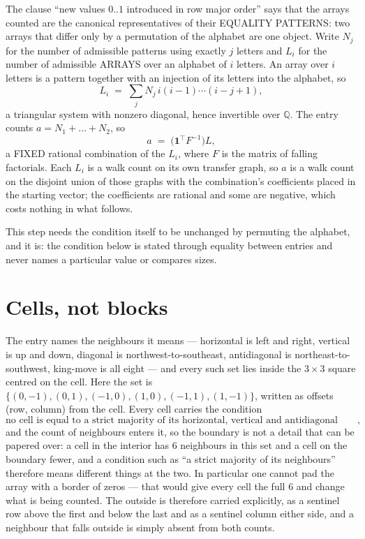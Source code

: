 \documentclass[11pt,a4paper]{article}
\theoremstyle{plain}
\theoremstyle{definition}
\begin{document}
The clause ``new values $0..1$ introduced in row major order'' says that the arrays
counted are the canonical representatives of their EQUALITY PATTERNS: two arrays that differ
only by a permutation of the alphabet are one object. Write $N_j$ for the number of admissible
patterns using exactly $j$ letters and $L_i$ for the number of admissible ARRAYS over an
alphabet of $i$ letters. An array over $i$ letters is a pattern together with an injection of
its letters into the alphabet, so
\[
L_i\;=\;\sum_{j}N_j\,i(i-1)\cdots(i-j+1),
\]
a triangular system with nonzero diagonal, hence invertible over $\mathbb{Q}$. The entry
counts $a=N_1+\dots+N_{2}$, so
\[
a\;=\;\bigl(\mathbf{1}^{\!\top}F^{-1}\bigr)L ,
\]
a FIXED rational combination of the $L_i$, where $F$ is the matrix of falling factorials.
Each $L_i$ is a walk count on its own transfer graph, so $a$ is a walk count on the disjoint
union of those graphs with the combination's coefficients placed in the starting vector; the
coefficients are rational and some are negative, which costs nothing in what follows.

This step needs the condition itself to be unchanged by permuting the alphabet, and it is:
the condition below is stated through equality between entries and never names a particular
value or compares sizes.

\section{Cells, not blocks}

The entry names the neighbours it means --- horizontal is left and right, vertical is up and
down, diagonal is northwest-to-southeast, antidiagonal is northeast-to-southwest, king-move is
all eight --- and every such set lies inside the $3\times3$ square centred on the cell. Here
the set is $\{(0,-1), (0,1), (-1,0), (1,0), (-1,1), (1,-1)\}$, written as offsets (row, column) from the cell. Every cell carries
the condition
\[
\text{no cell is equal to a strict majority of its horizontal, vertical and antidiagonal neighbours},
\]
and the count of neighbours enters it, so the boundary is not a detail that can be papered
over: a cell in the interior has $6$ neighbours in this set and a cell on the boundary
fewer, and a condition such as ``a strict majority of its neighbours'' therefore means
different things at the two. In particular one cannot pad the array with a border of zeros ---
that would give every cell the full $6$ and change what is being counted. The outside is
therefore carried
explicitly, as a sentinel row above the first and below the last and as a sentinel column
either side, and a neighbour that falls outside is simply absent from both counts.
\end{document}
